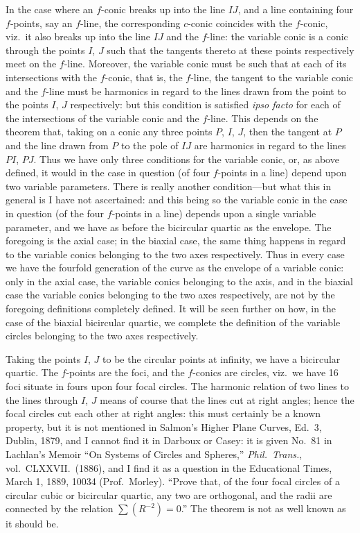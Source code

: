 \documentclass[11pt,a4paper]{article}
\begin{document}
In the case where an $f$-conic breaks up into the line $IJ$, and a line containing four $f$-points, say an $f$-line, the corresponding $c$-conic coincides with the $f$-conic, viz.\ it also breaks up into the line $IJ$ and the $f$-line: the variable conic is a conic through the points $I$, $J$ such that the tangents thereto at these points respectively meet on the $f$-line. Moreover, the variable conic must be such that at each of its intersections with the $f$-conic, that is, the $f$-line, the tangent to the variable conic and the $f$-line must be harmonics in regard to the lines drawn from the point to the points $I$, $J$ respectively: but this condition is satisfied \emph{ipso facto} for each of the intersections of the variable conic and the $f$-line. This depends on the theorem that, taking on a conic any three points $P$, $I$, $J$, then the tangent at $P$ and the line drawn from $P$ to the pole of $IJ$ are harmonics in regard to the lines $PI$, $PJ$. Thus we have only three conditions for the variable conic, or, as above defined, it would in the case in question (of four $f$-points in a line) depend upon two variable parameters. There is really another condition---but what this in general is I have not ascertained: and this being so the variable conic in the case in question (of the four $f$-points in a line) depends upon a single variable parameter, and we have as before the bicircular quartic as the envelope. The foregoing is the axial case; in the biaxial case, the same thing happens in regard to the variable conics belonging to the two axes respectively. Thus in every case we have the fourfold generation of the curve as the envelope of a variable conic: only in the axial case, the variable conics belonging to the axis, and in the biaxial case the variable conics belonging to the two axes respectively, are not by the foregoing definitions completely defined. It will be seen further on how, in the case of the biaxial bicircular quartic, we complete the definition of the variable circles belonging to the two axes respectively.

Taking the points $I$, $J$ to be the circular points at infinity, we have a bicircular quartic. The $f$-points are the foci, and the $f$-conics are circles, viz.\ we have 16 foci situate in fours upon four focal circles. The harmonic relation of two lines to the lines through $I$, $J$ means of course that the lines cut at right angles; hence the focal circles cut each other at right angles: this must certainly be a known property, but it is not mentioned in Salmon's Higher Plane Curves, Ed.\ 3, Dublin, 1879, and I cannot find it in Darboux or Casey: it is given No.\ 81 in Lachlan's Memoir ``On Systems of Circles and Spheres,'' \emph{Phil.\ Trans.}, vol.\ CLXXVII.\ (1886), and I find it as a question in the Educational Times, March 1, 1889, 10034 (Prof.\ Morley). ``Prove that, of the four focal circles of a circular cubic or bicircular quartic, any two are orthogonal, and the radii are connected by the relation $\sum(R^{-2}) = 0$.'' The theorem is not as well known as it should be.
\end{document}
